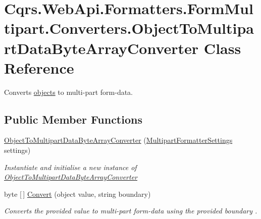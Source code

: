 \hypertarget{classCqrs_1_1WebApi_1_1Formatters_1_1FormMultipart_1_1Converters_1_1ObjectToMultipartDataByteArrayConverter}{}\section{Cqrs.\+Web\+Api.\+Formatters.\+Form\+Multipart.\+Converters.\+Object\+To\+Multipart\+Data\+Byte\+Array\+Converter Class Reference}
\label{classCqrs_1_1WebApi_1_1Formatters_1_1FormMultipart_1_1Converters_1_1ObjectToMultipartDataByteArrayConverter}


Converts \hyperlink{}{objects} to multi-\/part form-\/data.  


\subsection*{Public Member Functions}
\begin{DoxyCompactItemize}
\item 
\hyperlink{classCqrs_1_1WebApi_1_1Formatters_1_1FormMultipart_1_1Converters_1_1ObjectToMultipartDataByteArrayConverter_a1e647950d2959aa53e54a17ba86df058_a1e647950d2959aa53e54a17ba86df058}{Object\+To\+Multipart\+Data\+Byte\+Array\+Converter} (\hyperlink{classCqrs_1_1WebApi_1_1Formatters_1_1FormMultipart_1_1Infrastructure_1_1MultipartFormatterSettings}{Multipart\+Formatter\+Settings} settings)
\begin{DoxyCompactList}\small\item\em Instantiate and initialise a new instance of \hyperlink{classCqrs_1_1WebApi_1_1Formatters_1_1FormMultipart_1_1Converters_1_1ObjectToMultipartDataByteArrayConverter}{Object\+To\+Multipart\+Data\+Byte\+Array\+Converter} \end{DoxyCompactList}\item 
byte \mbox{[}$\,$\mbox{]} \hyperlink{classCqrs_1_1WebApi_1_1Formatters_1_1FormMultipart_1_1Converters_1_1ObjectToMultipartDataByteArrayConverter_af7bd8ac108a7e95f5961a14064595f84_af7bd8ac108a7e95f5961a14064595f84}{Convert} (object value, string boundary)
\begin{DoxyCompactList}\small\item\em Converts the provided {\itshape value}  to multi-\/part form-\/data using the provided {\itshape boundary} . \end{DoxyCompactList}\end{DoxyCompactItemize}


